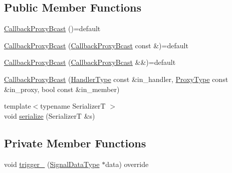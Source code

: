 \subsection*{Public Member Functions}
\begin{DoxyCompactItemize}
\item 
\hyperlink{structvt_1_1pipe_1_1callback_1_1_callback_proxy_bcast_a0f65df639ce4c3a9760b50107defbcad}{Callback\+Proxy\+Bcast} ()=default
\item 
\hyperlink{structvt_1_1pipe_1_1callback_1_1_callback_proxy_bcast_a196de6268c374af67345657d9cb2a8d4}{Callback\+Proxy\+Bcast} (\hyperlink{structvt_1_1pipe_1_1callback_1_1_callback_proxy_bcast}{Callback\+Proxy\+Bcast} const \&)=default
\item 
\hyperlink{structvt_1_1pipe_1_1callback_1_1_callback_proxy_bcast_adbcbe9ba02478e813d43b53b26ffedd0}{Callback\+Proxy\+Bcast} (\hyperlink{structvt_1_1pipe_1_1callback_1_1_callback_proxy_bcast}{Callback\+Proxy\+Bcast} \&\&)=default
\item 
\hyperlink{structvt_1_1pipe_1_1callback_1_1_callback_proxy_bcast_a046f6d76994fc3d87f3e92f9630690d0}{Callback\+Proxy\+Bcast} (\hyperlink{namespacevt_af64846b57dfcaf104da3ef6967917573}{Handler\+Type} const \&in\+\_\+handler, \hyperlink{structvt_1_1pipe_1_1callback_1_1_callback_proxy_bcast_a27c62cb9cbd1dcd3f135dcd98d98c991}{Proxy\+Type} const \&in\+\_\+proxy, bool const \&in\+\_\+member)
\item 
{\footnotesize template$<$typename SerializerT $>$ }\\void \hyperlink{structvt_1_1pipe_1_1callback_1_1_callback_proxy_bcast_acb68ed7d028b9286adb5758f680258cf}{serialize} (SerializerT \&s)
\end{DoxyCompactItemize}
\subsection*{Private Member Functions}
\begin{DoxyCompactItemize}
\item 
void \hyperlink{structvt_1_1pipe_1_1callback_1_1_callback_proxy_bcast_a6ec265f95247ccdb1e2dcca909823ae8}{trigger\+\_\+} (\hyperlink{structvt_1_1pipe_1_1callback_1_1_callback_proxy_bcast_ae26574a2b9198a4b4e427bbaab76de53}{Signal\+Data\+Type} $\ast$data) override
\end{DoxyCompactItemize}
